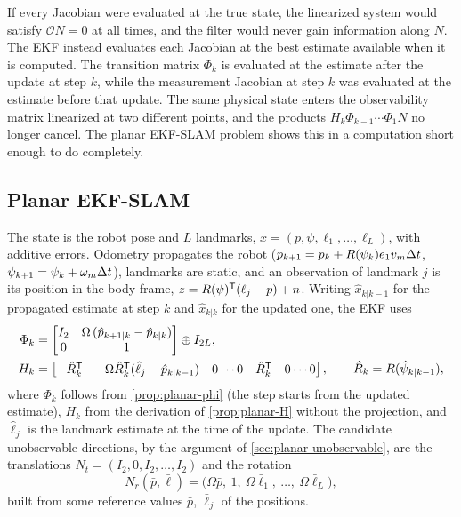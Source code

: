 If every Jacobian were evaluated at the true state, the linearized system would satisfy $\mathcal{O}N = 0$ at all times, and the
filter would never gain information along $N$. The EKF instead evaluates each Jacobian at the best estimate available when it is
computed. The transition matrix $\Phi_k$ is evaluated at the estimate after the update at step $k$, while the measurement Jacobian at step $k$ was evaluated
at the estimate before that update. The same physical state enters the observability matrix linearized at two different points, and the products
$H_k\Phi_{k-1}\cdots\Phi_1N$ no longer cancel. The planar EKF-SLAM problem shows this in a computation short enough to do completely.

\subsection{Planar EKF-SLAM}

The state is the robot pose and $L$ landmarks, $x = (p, \psi, \ell_1, \dots, \ell_L)$, with additive errors. Odometry propagates the robot
($p_{k+1} = p_k + R(\psi_k)e_1v_m{\Delta t}$, $\psi_{k+1} = \psi_k + \omega_m{\Delta t}$), landmarks are static, and an observation of landmark $j$ is its position in the
body frame, $z = R(\psi)^{\mathsf{T}}(\ell_j - p) + n$. Writing $\hat x_{k|k-1}$ for the propagated estimate at step $k$ and $\hat x_{k|k}$ for the updated one, the EKF uses
\begin{align}
  \Phi_k &= \begin{bmatrix} I_2 & \Omega\,(\hat p_{k+1|k} - \hat p_{k|k}) \\ 0 & 1 \end{bmatrix} \oplus I_{2L}, \label{eq:slam-phi} \\
  H_k &= \begin{bmatrix} -\hat R_k^{\mathsf{T}} & -\Omega\hat R_k^{\mathsf{T}}(\hat\ell_j - \hat p_{k|k-1}) & 0 \cdots 0 & \hat R_k^{\mathsf{T}} & 0 \cdots 0 \end{bmatrix},
  \qquad \hat R_k = R(\hat\psi_{k|k-1}), \label{eq:slam-H}
\end{align}
where $\Phi_k$ follows from \cref{prop:planar-phi} (the step starts from the updated estimate), $H_k$ from the derivation of \cref{prop:planar-H} without the
projection, and $\hat\ell_j$ is the landmark estimate at the time of the update. The candidate unobservable directions, by the argument of
\cref{sec:planar-unobservable}, are the translations $N_t = (I_2, 0, I_2, \dots, I_2)$ and the rotation
\begin{equation}
  N_r(\bar p, \bar\ell) = \big(\Omega\bar p,\ 1,\ \Omega\bar\ell_1,\ \dots,\ \Omega\bar\ell_L\big),
\end{equation}
built from some reference values $\bar p$, $\bar\ell_j$ of the positions.


